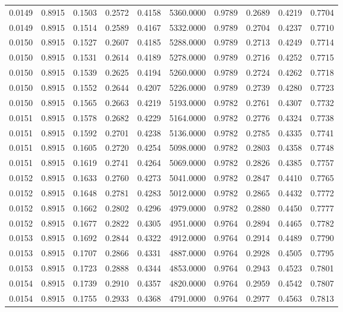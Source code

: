\begin{tabular}{rrrrrrrrrr}
0.0149 & 0.8915 & 0.1503 & 0.2572 & 0.4158 & 5360.0000 & 0.9789 & 0.2689 & 0.4219 & 0.7704 \\
0.0149 & 0.8915 & 0.1514 & 0.2589 & 0.4167 & 5332.0000 & 0.9789 & 0.2704 & 0.4237 & 0.7710 \\
0.0150 & 0.8915 & 0.1527 & 0.2607 & 0.4185 & 5288.0000 & 0.9789 & 0.2713 & 0.4249 & 0.7714 \\
0.0150 & 0.8915 & 0.1531 & 0.2614 & 0.4189 & 5278.0000 & 0.9789 & 0.2716 & 0.4252 & 0.7715 \\
0.0150 & 0.8915 & 0.1539 & 0.2625 & 0.4194 & 5260.0000 & 0.9789 & 0.2724 & 0.4262 & 0.7718 \\
0.0150 & 0.8915 & 0.1552 & 0.2644 & 0.4207 & 5226.0000 & 0.9789 & 0.2739 & 0.4280 & 0.7723 \\
0.0150 & 0.8915 & 0.1565 & 0.2663 & 0.4219 & 5193.0000 & 0.9782 & 0.2761 & 0.4307 & 0.7732 \\
0.0151 & 0.8915 & 0.1578 & 0.2682 & 0.4229 & 5164.0000 & 0.9782 & 0.2776 & 0.4324 & 0.7738 \\
0.0151 & 0.8915 & 0.1592 & 0.2701 & 0.4238 & 5136.0000 & 0.9782 & 0.2785 & 0.4335 & 0.7741 \\
0.0151 & 0.8915 & 0.1605 & 0.2720 & 0.4254 & 5098.0000 & 0.9782 & 0.2803 & 0.4358 & 0.7748 \\
0.0151 & 0.8915 & 0.1619 & 0.2741 & 0.4264 & 5069.0000 & 0.9782 & 0.2826 & 0.4385 & 0.7757 \\
0.0152 & 0.8915 & 0.1633 & 0.2760 & 0.4273 & 5041.0000 & 0.9782 & 0.2847 & 0.4410 & 0.7765 \\
0.0152 & 0.8915 & 0.1648 & 0.2781 & 0.4283 & 5012.0000 & 0.9782 & 0.2865 & 0.4432 & 0.7772 \\
0.0152 & 0.8915 & 0.1662 & 0.2802 & 0.4296 & 4979.0000 & 0.9782 & 0.2880 & 0.4450 & 0.7777 \\
0.0152 & 0.8915 & 0.1677 & 0.2822 & 0.4305 & 4951.0000 & 0.9764 & 0.2894 & 0.4465 & 0.7782 \\
0.0153 & 0.8915 & 0.1692 & 0.2844 & 0.4322 & 4912.0000 & 0.9764 & 0.2914 & 0.4489 & 0.7790 \\
0.0153 & 0.8915 & 0.1707 & 0.2866 & 0.4331 & 4887.0000 & 0.9764 & 0.2928 & 0.4505 & 0.7795 \\
0.0153 & 0.8915 & 0.1723 & 0.2888 & 0.4344 & 4853.0000 & 0.9764 & 0.2943 & 0.4523 & 0.7801 \\
0.0154 & 0.8915 & 0.1739 & 0.2910 & 0.4357 & 4820.0000 & 0.9764 & 0.2959 & 0.4542 & 0.7807 \\
0.0154 & 0.8915 & 0.1755 & 0.2933 & 0.4368 & 4791.0000 & 0.9764 & 0.2977 & 0.4563 & 0.7813 \\

\end{tabular}
